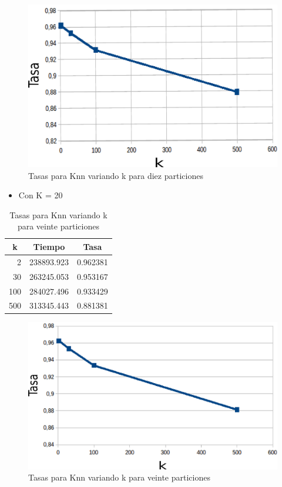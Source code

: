     \begin{figure}[H]
    \centering
    \includegraphics[scale=0.3]{Graficos/knnTasa10.png}
    \caption{Tasas para Knn variando k para diez particiones}
	\label{knnTasa10}
    \end{figure}
\bigskip
\bigskip
\bigskip




\begin{itemize}
\item Con K = 20\\
\end{itemize} 

\begin{table}[H]
\centering
\begin{tabular}{|r|r|r|}
\hline
\multicolumn{1}{|c|}{k} & \multicolumn{1}{c|}{Tiempo} & \multicolumn{1}{c|}{Tasa} \\ \hline
2 & 238893.923 & 0.962381 \\ \hline
30 & 263245.053 & 0.953167 \\ \hline
100 & 284027.496 & 0.933429 \\ \hline
500 & 313345.443 & 0.881381 \\ \hline
\end{tabular}
 \caption{Tasas para Knn variando k para veinte particiones}
\label{}
\end{table}
\bigskip
\bigskip
\bigskip

    \begin{figure}[H]
    \centering
    \includegraphics[scale=0.3]{Graficos/knnTasa20.png}
    \caption{Tasas para Knn variando k para veinte particiones}
	\label{knnTasa20}
    \end{figure}
\bigskip
\bigskip

